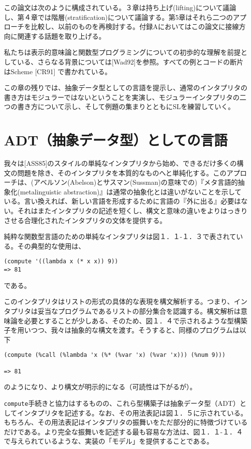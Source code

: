 \documentclass[11pt, oneside]{jsbook}   	%
\begin{document}
この論文は次のように構成されている。３章は持ち上げ(lifting)について議論し、第４章では階層(stratification)について議論する。第5章はそれら二つのアプローチを比較し、以前のものを再検討する。付録Aにおいてはこの論文に接線方向に関連する話題を取り上げる。

私たちは表示的意味論と関数型プログラミングについての初歩的な理解を前提としている、さらなる背景については[Wad92]を参照。すべての例とコードの断片はScheme [CR91] で書かれている。

この章の残りでは、抽象データ型としての言語を提示し、通常のインタプリタの書き方はモジュラーではないということを実演し、モジュラーインタプリタの二つの書き方について示し、そして例題の集まりとともにSLを練習していく。

\section{ ADT（抽象データ型）としての言語}
我々は[ASS85]のスタイルの単純なインタプリタから始め、できるだけ多くの構文の問題を除き、そのインタプリタを本質的なものへと単純化する。このアプローチは、(アベルソン(Abelson)とサスマン(Sussman)の意味での)『メタ言語的抽象化(metalinguistic abstraction)』は通常の抽象化とは違いがないことを示している。言い換えれば、新しい言語を形成するために言語の『外に出る』必要はない。それはまたインタプリタの記述を短くし、構文と意味の違いをよりはっきりさせる合理化されたインタプリタの文体を提供する。

純粋な関数型言語のための単純なインタプリタは図１．１-１．３で表されている。その典型的な使用は、
\begin{lstlisting}
(compute '((lambda x (* x x)) 9))
=> 81
\end{lstlisting}
である。

このインタプリタはリストの形式の具体的な表現を構文解析する。つまり、インタプリタは妥当なプログラムであるリストの部分集合を認識する。構文解析は意味論を必要とすることが少しある、そのため、図１．４で示されるような型構築子を用いつつ、我々は抽象的な構文を渡す。そうすると、同様のプログラムは以下
\begin{lstlisting}
(compute (%call (%lambda 'x (%* (%var 'x) (%var 'x))) (%num 9)))

=> 81
\end{lstlisting}
のようになり、より構文が明示的になる（可読性は下がるが）。

\verb|compute|手続きと協力はするものの、これら型構築子は抽象データ型（ADT）としてインタプリタを記述する。なお、その用法表記は図１．５に示されている。もちろん、その用法表記はインタプリタの振舞いをただ部分的に特徴づけているだけである。より完全な振舞いを記述する最も容易な方法は、図１．１-１．４で与えられているような、実装の「モデル」を提供することである。
\end{document}

